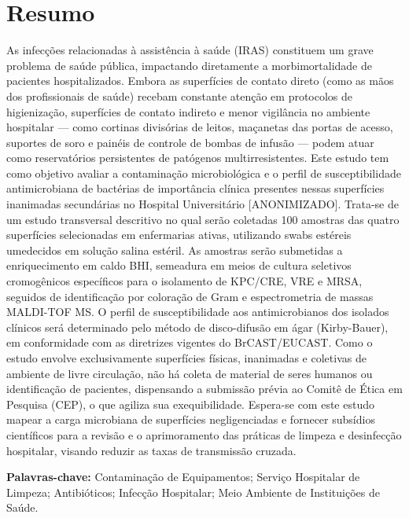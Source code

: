 \documentclass[12pt,a4paper]{article}
\begin{document}
\section{Resumo}
\noindent As infecções relacionadas à assistência à saúde (IRAS) constituem um grave problema de saúde pública, impactando diretamente a morbimortalidade de pacientes hospitalizados. Embora as superfícies de contato direto (como as mãos dos profissionais de saúde) recebam constante atenção em protocolos de higienização, superfícies de contato indireto e menor vigilância no ambiente hospitalar --- como cortinas divisórias de leitos, maçanetas das portas de acesso, suportes de soro e painéis de controle de bombas de infusão --- podem atuar como reservatórios persistentes de patógenos multirresistentes. Este estudo tem como objetivo avaliar a contaminação microbiológica e o perfil de susceptibilidade antimicrobiana de bactérias de importância clínica presentes nessas superfícies inanimadas secundárias no Hospital Universitário [ANONIMIZADO]. Trata-se de um estudo transversal descritivo no qual serão coletadas 100 amostras das quatro superfícies selecionadas em enfermarias ativas, utilizando swabs estéreis umedecidos em solução salina estéril. As amostras serão submetidas a enriquecimento em caldo BHI, semeadura em meios de cultura seletivos cromogênicos específicos para o isolamento de KPC/CRE, VRE e MRSA, seguidos de identificação por coloração de Gram e espectrometria de massas MALDI-TOF MS. O perfil de susceptibilidade aos antimicrobianos dos isolados clínicos será determinado pelo método de disco-difusão em ágar (Kirby-Bauer), em conformidade com as diretrizes vigentes do BrCAST/EUCAST. Como o estudo envolve exclusivamente superfícies físicas, inanimadas e coletivas de ambiente de livre circulação, não há coleta de material de seres humanos ou identificação de pacientes, dispensando a submissão prévia ao Comitê de Ética em Pesquisa (CEP), o que agiliza sua exequibilidade. Espera-se com este estudo mapear a carga microbiana de superfícies negligenciadas e fornecer subsídios científicos para a revisão e o aprimoramento das práticas de limpeza e desinfecção hospitalar, visando reduzir as taxas de transmissão cruzada.

\vspace{12pt}
\noindent \textbf{Palavras-chave:} Contaminação de Equipamentos; Serviço Hospitalar de Limpeza; Antibióticos; Infecção Hospitalar; Meio Ambiente de Instituições de Saúde.
\newpage
\end{document}
